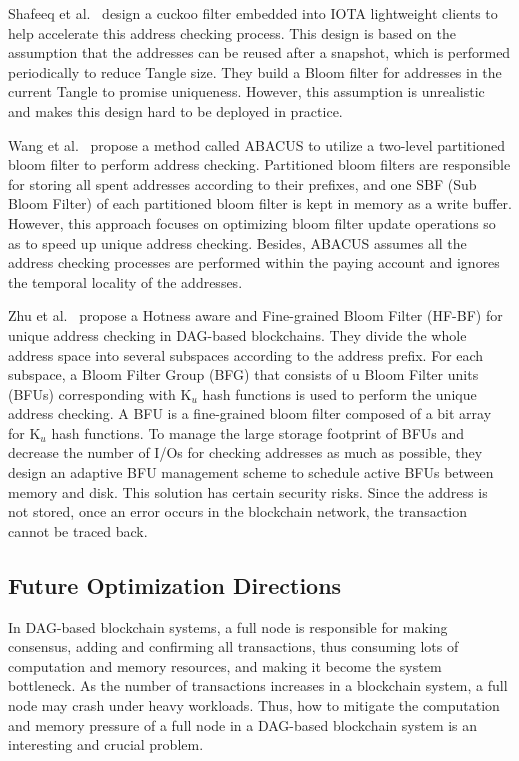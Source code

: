 \documentclass[acmsmall]{acmart}
\begin{document}
Shafeeq et al.~\cite{shafeeq2019curbing} design a cuckoo filter embedded into IOTA lightweight clients to help accelerate this address checking process. This design is based on the assumption that the addresses can be reused after a snapshot, which is performed periodically to reduce Tangle size. They build a Bloom filter for addresses in the current Tangle to promise uniqueness. However, this assumption is unrealistic and makes this design hard to be deployed in practice.

Wang et al.~\cite{wangtianyu} propose a method called ABACUS to utilize a two-level partitioned bloom filter to perform address checking. Partitioned bloom filters are responsible for storing all spent addresses according to their prefixes, and one SBF (Sub Bloom Filter) of each partitioned bloom filter is kept in memory as a write buffer. However, this approach focuses on optimizing bloom filter update operations so as to speed up unique address checking. Besides, ABACUS assumes all the address checking processes are performed within the paying account and ignores the temporal locality of the addresses.

Zhu et al.~\cite{zhuwenbin} propose a Hotness aware and Fine-grained Bloom Filter (HF-BF) for unique address checking in DAG-based blockchains. They divide the whole address space into several subspaces according to the address prefix. For each subspace, a Bloom Filter Group (BFG) that consists of u Bloom Filter units (BFUs) corresponding with K$_u$ hash functions is used to perform the unique address checking. A BFU is a fine-grained bloom filter composed of a bit array for K$_u$ hash functions. To manage the large storage footprint of BFUs and decrease the number of I/Os for checking addresses as much as possible, they design an adaptive BFU management scheme to schedule active BFUs between memory and disk.
This solution has certain security risks. Since the address is not stored, once an error occurs in the blockchain network, the transaction cannot be traced back.



\subsection{Future Optimization Directions}

In DAG-based blockchain systems, a full node is responsible for making consensus, adding and confirming all transactions, thus consuming lots of computation and memory resources, and making it become the system bottleneck. 
As the number of transactions increases in a blockchain system, a full node may crash under heavy workloads. Thus, how to mitigate the computation and memory pressure of a full node in a DAG-based blockchain system is an interesting and crucial problem.
\end{document}
